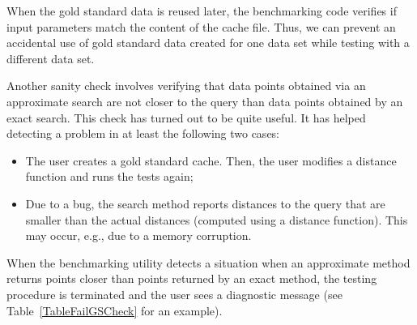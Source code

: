 \documentclass[runningheads,a4paper]{llncs}
\begin{document}
{When the gold standard data is reused later,
the benchmarking code verifies if input parameters match the content of the cache file. 
Thus, we can prevent an accidental use of gold standard data created for one data set
while testing with a different data set.

Another sanity check involves verifying that data points obtained via an approximate
search are not closer to the query than data points obtained by an exact search.
This check has turned out to be quite useful. 
It has helped detecting a problem in at least the following two cases:
\begin{itemize}
\item The user creates a gold standard cache. Then, the user modifies a distance function and runs the tests again;
\item Due to a bug, the search method reports distances to the query that are smaller than
the actual distances (computed using a distance function). This may occur, e.g., due to
a memory corruption.
\end{itemize}

When the benchmarking utility detects a situation when an approximate method
returns points closer than points returned by an exact method, the testing procedure is terminated
and the user sees a diagnostic message (see Table~\ref{TableFailGSCheck} for an example). 

}
\end{document}

